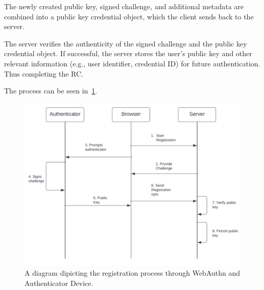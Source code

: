 The newly created public key, signed challenge, and additional metadata are combined into a public key credential object,
which the client sends back to the server.

The server verifies the authenticity of the signed challenge and the public key credential object.
If successful, the server stores the user's public key and other relevant information (e.g., user identifier, credential ID)
for future authentication.
Thus completing the RC\@.

The process can be seen in~\ref{fig:registration}.
\begin{figure}[htbp]
  \centering
  \includegraphics[width=0.75\linewidth]{images/Registration}
  \caption{\footnotesize A diagram dipicting the registration process through WebAuthn and Authenticator Device.}
  \label{fig:registration}
\end{figure}

